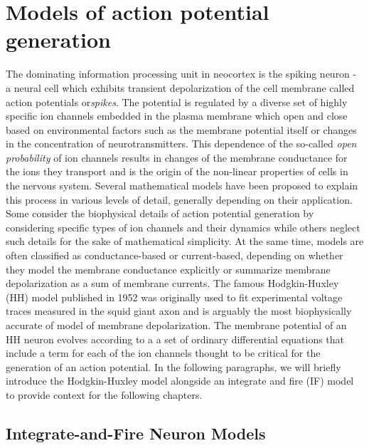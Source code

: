\documentclass{ucetd}
\begin{document}
\mainmatter

\chapter{Models of action potential generation}

The dominating information processing unit in neocortex is the spiking neuron - a neural cell which exhibits transient depolarization of the cell membrane called action potentials or\emph{spikes}. The potential is regulated by a diverse set of highly specific ion channels embedded in the plasma membrane which open and close based on environmental factors such as the membrane potential itself or changes in the concentration of neurotransmitters. This dependence of the so-called \emph{open probability} of ion channels results in changes of the membrane conductance for the ions they transport and is the origin of the non-linear properties of  cells in the nervous system. Several mathematical models have been proposed to explain this process in various levels of detail, generally depending on their application. Some consider the biophysical details of action potential generation by considering specific types of ion channels and their dynamics while others neglect such details for the sake of mathematical simplicity. At the same time, models are often classified as conductance-based or current-based, depending on whether they model the membrane conductance explicitly or summarize membrane depolarization as a sum of membrane currents. The famous Hodgkin-Huxley (HH) model published in 1952 was originally used to fit experimental voltage traces measured in the squid giant axon and is arguably the most biophysically accurate of model of membrane depolarization. The membrane potential of an HH neuron evolves according to a a set of ordinary differential equations that include a term for each of the ion channels thought to be critical for the generation of an action potential. In the following paragraphs, we will briefly introduce the Hodgkin-Huxley model alongside an integrate and fire (IF) model to provide context for the following chapters.

\section{Integrate-and-Fire Neuron Models}
\end{document}

